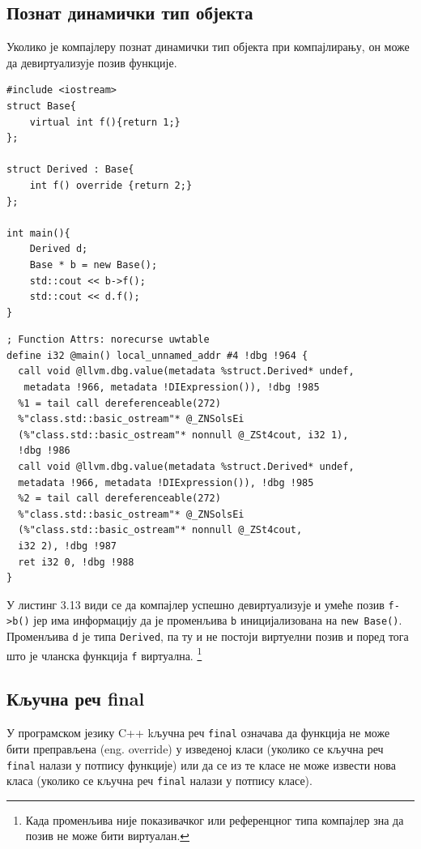 \documentclass[12pt,oneside]{memoir}
\begin{document}
 \subsection{Познат динамички тип објекта}
 Уколико је компајлеру познат динамички тип објекта при компајлирању, он може 
 да девиртуализује позив функције.
 
 \begin{lstlisting}[frame=single,caption={Пример са познатим динамичким типом објекта }, captionpos=b]
#include <iostream>
struct Base{
    virtual int f(){return 1;}
};

struct Derived : Base{
    int f() override {return 2;}
};

int main(){
    Derived d;
    Base * b = new Base();
    std::cout << b->f();
    std::cout << d.f();  
}
 \end{lstlisting}
 
 \begin{lstlisting}[frame=single,caption={Међурепрезентација програма из листинга 3.12}, captionpos=b]
; Function Attrs: norecurse uwtable
define i32 @main() local_unnamed_addr #4 !dbg !964 {
  call void @llvm.dbg.value(metadata %struct.Derived* undef,
   metadata !966, metadata !DIExpression()), !dbg !985
  %1 = tail call dereferenceable(272) 
  %"class.std::basic_ostream"* @_ZNSolsEi
  (%"class.std::basic_ostream"* nonnull @_ZSt4cout, i32 1), 
  !dbg !986
  call void @llvm.dbg.value(metadata %struct.Derived* undef, 
  metadata !966, metadata !DIExpression()), !dbg !985
  %2 = tail call dereferenceable(272) 
  %"class.std::basic_ostream"* @_ZNSolsEi
  (%"class.std::basic_ostream"* nonnull @_ZSt4cout, 
  i32 2), !dbg !987
  ret i32 0, !dbg !988
}
 \end{lstlisting}
 
 У листинг 3.13 види се да компајлер успешно девиртуализује и умеће позив 
 \texttt{f->b()} јер има информацију да је променљива \texttt{b} иницијализована на 
 \texttt{new Base()}.
 Променљива \texttt{d} је типа \texttt{Derived}, па ту и не постоји виртуелни позив
  и поред тога што је чланска функција \texttt{f} виртуална.
 \footnote{Када променљива није показивачког или референцног типа 
  компајлер зна да позив не може бити виртуалан.}
 
 \subsection{Кључна реч final}
 У програмском језику C++ kључна реч \texttt{final} означава да функција не може бити 
 преправљена (eng. override) у изведеној класи (уколико се кључна реч \texttt{final} налази у потпису функције)
 или да се из те класе не може извести нова класа (уколико се кључна реч \texttt{final}
 налази у потпису класе).
	 
\end{document}
